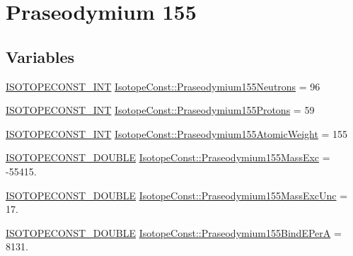 \hypertarget{group___isotope_const-_praseodymium-_pr155}{}\section{Praseodymium 155}
\label{group___isotope_const-_praseodymium-_pr155}
\subsection*{Variables}
\begin{DoxyCompactItemize}
\item 
\mbox{\hyperlink{group___isotope_const-_macros_ga5f18360b3e99483a35c32d789e62621c}{I\+S\+O\+T\+O\+P\+E\+C\+O\+N\+S\+T\+\_\+\+I\+NT}} \mbox{\hyperlink{group___isotope_const-_praseodymium-_pr155_gaeb4a6fae40dca3d866d3f0e50ba2350b}{Isotope\+Const\+::\+Praseodymium155\+Neutrons}} = 96
\item 
\mbox{\hyperlink{group___isotope_const-_macros_ga5f18360b3e99483a35c32d789e62621c}{I\+S\+O\+T\+O\+P\+E\+C\+O\+N\+S\+T\+\_\+\+I\+NT}} \mbox{\hyperlink{group___isotope_const-_praseodymium-_pr155_ga644765707ef8c2c44767db49ddaf1a92}{Isotope\+Const\+::\+Praseodymium155\+Protons}} = 59
\item 
\mbox{\hyperlink{group___isotope_const-_macros_ga5f18360b3e99483a35c32d789e62621c}{I\+S\+O\+T\+O\+P\+E\+C\+O\+N\+S\+T\+\_\+\+I\+NT}} \mbox{\hyperlink{group___isotope_const-_praseodymium-_pr155_ga8b2636f8ac1cb66f9327cebd589e2007}{Isotope\+Const\+::\+Praseodymium155\+Atomic\+Weight}} = 155
\item 
\mbox{\hyperlink{group___isotope_const-_macros_ga8f45a7272ce02c0b4c65c44636ed719a}{I\+S\+O\+T\+O\+P\+E\+C\+O\+N\+S\+T\+\_\+\+D\+O\+U\+B\+LE}} \mbox{\hyperlink{group___isotope_const-_praseodymium-_pr155_ga29fab6d6cfc28d6984a22c2781a97644}{Isotope\+Const\+::\+Praseodymium155\+Mass\+Exc}} = -\/55415.
\item 
\mbox{\hyperlink{group___isotope_const-_macros_ga8f45a7272ce02c0b4c65c44636ed719a}{I\+S\+O\+T\+O\+P\+E\+C\+O\+N\+S\+T\+\_\+\+D\+O\+U\+B\+LE}} \mbox{\hyperlink{group___isotope_const-_praseodymium-_pr155_ga2dfcce1d413750dd22d34238c004101c}{Isotope\+Const\+::\+Praseodymium155\+Mass\+Exc\+Unc}} = 17.
\item 
\mbox{\hyperlink{group___isotope_const-_macros_ga8f45a7272ce02c0b4c65c44636ed719a}{I\+S\+O\+T\+O\+P\+E\+C\+O\+N\+S\+T\+\_\+\+D\+O\+U\+B\+LE}} \mbox{\hyperlink{group___isotope_const-_praseodymium-_pr155_ga6c060ed184d9c171886af34735df3bba}{Isotope\+Const\+::\+Praseodymium155\+Bind\+E\+PerA}} = 8131.

\end{DoxyCompactItemize}
